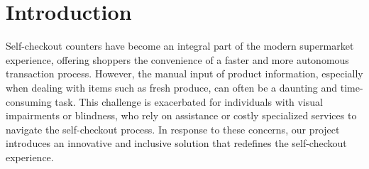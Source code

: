 \documentclass[manuscript]{aastex631}
\begin{document}


\section{Introduction} \label{sec:intro}

Self-checkout counters have become an integral part of the modern supermarket experience, offering shoppers the convenience of a faster and more autonomous transaction process. However, the manual input of product information, especially when dealing with items such as fresh produce, can often be a daunting and time-consuming task. This challenge is exacerbated for individuals with visual impairments or blindness, who rely on assistance or costly specialized services to navigate the self-checkout process. In response to these concerns, our project introduces an innovative and inclusive solution that redefines the self-checkout experience.
\end{document}
